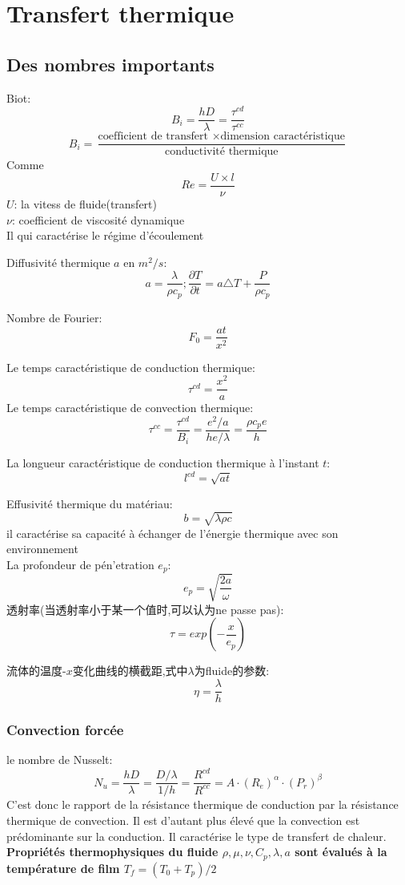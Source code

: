 \documentclass[openany]{book}
\begin{document}
\chapter{Transfert thermique}
\section{Des nombres importants}
Biot:$$B_i = \frac{ hD}{\lambda }=\frac{\tau^{cd}}{\tau^{cc}}$$
$$B_i = \frac{ \text{coefficient de transfert } \times \text{dimension caract\'eristique} }{\text{conductivit\'e thermique}}$$
Comme $$Re=\frac{U\times l}{\nu}$$
$U$: la vitess de fluide(transfert)\\
$\nu$: coefficient de viscosit\'e dynamique\\
Il qui caract\'erise le r\'egime d'\'ecoulement

Diffusivit\'e thermique $a$ en $m^2/s$:$$a=\frac{\lambda }{\rho c_p};\frac{\partial T}{\partial t}=a\triangle T + \frac{P}{\rho c_p}$$

Nombre de Fourier:$$F_0=\frac{ at}{x^2}$$

Le temps caract\'eristique de conduction thermique:$$\tau^{cd}=\frac{x^2}{a}$$
Le temps caract\'eristique de convection thermique:$$\tau^{cc}=\frac{\tau^{cd}}{B_i}=\frac{e^2/a }{he/\lambda }=\frac{\rho c_p e}{h}$$

La longueur caract\'eristique de conduction thermique \`a l'instant $t$:$$l^{cd}=\sqrt{at}$$

Effusivit\'e thermique du mat\'eriau:$$b=\sqrt{\lambda \rho c}$$
il caract\'erise sa capacit\'e \`a \'echanger de l'\'energie thermique avec son environnement\\

La profondeur de p\'en'etration $e_p$:$$e_p=\sqrt{\frac{2a}{\omega}}$$
透射率(当透射率小于某一个值时,可以认为ne passe pas):$$\tau = exp(-\frac{x}{e_p})$$


流体的温度-$x$变化曲线的横截距,式中$\lambda$为fluide的参数:$$\eta=\frac{\lambda }{h}$$

\subsection{Convection forc\'ee}
le nombre de Nusselt:$$N_u = \frac{hD}{\lambda }=\frac{D/\lambda }{1/h}=\frac{R^{cd}}{R^{cc}}=A\cdot (R_e)^{\alpha}\cdot (P_r)^{\beta}$$
C'est donc le rapport de la r\'esistance thermique de conduction par la r\'esistance thermique de convection. Il est d'autant plus \'elev\'e que la convection est pr\'edominante sur la conduction. Il caract\'erise le type de transfert
de chaleur.\\
\textbf{Propri\'et\'es thermophysiques du fluide $\rho, \mu, \nu, C_p, \lambda, a$ sont \'evalu\'es \`a la temp\'erature de film $T_f = (T_0 + T_p)/2$}
\end{document}
